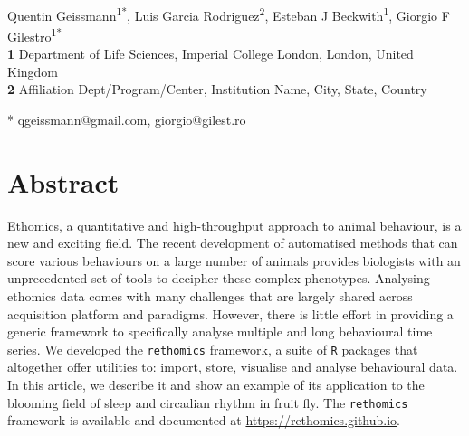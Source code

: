 \documentclass[10pt,letterpaper]{article}\usepackage[]{graphicx}\usepackage[]{color}
\date{}
\begin{document}
\vspace*{0.2in}

\begin{flushleft}
{\Large
\textbf{} 
}
\newline
\\
Quentin Geissmann\textsuperscript{1*},
Luis Garcia Rodriguez\textsuperscript{2},
Esteban J Beckwith\textsuperscript{1},
Giorgio F Gilestro\textsuperscript{1*}
\\
\bigskip
\textbf{1} Department of Life Sciences, Imperial College London, London, United Kingdom
\\
\textbf{2} Affiliation Dept/Program/Center, Institution Name, City, State, Country %
\\
\bigskip


* qgeissmann@gmail.com, giorgio@gilest.ro

\end{flushleft}
\section*{Abstract}
Ethomics, a quantitative and high-throughput approach to animal behaviour, is a new and exciting field.
The recent development of automatised methods that can score various behaviours on a large number of animals
provides biologists with an unprecedented set of tools to decipher these complex phenotypes. 
Analysing ethomics data comes with many challenges that are largely shared across acquisition platform and paradigms.
However, there is little effort in providing a generic framework to specifically analyse multiple and long behavioural time series.
We developed the \texttt{rethomics} framework, a suite of \texttt{R} packages that altogether offer utilities to:
import, store, visualise and analyse behavioural data.
In this article, we describe it and show an example of its application to the blooming field of sleep and circadian rhythm in fruit fly.
The \texttt{rethomics} framework is available and documented at \href{https://rethomics.github.io}{https://rethomics.github.io}.
\end{document}
